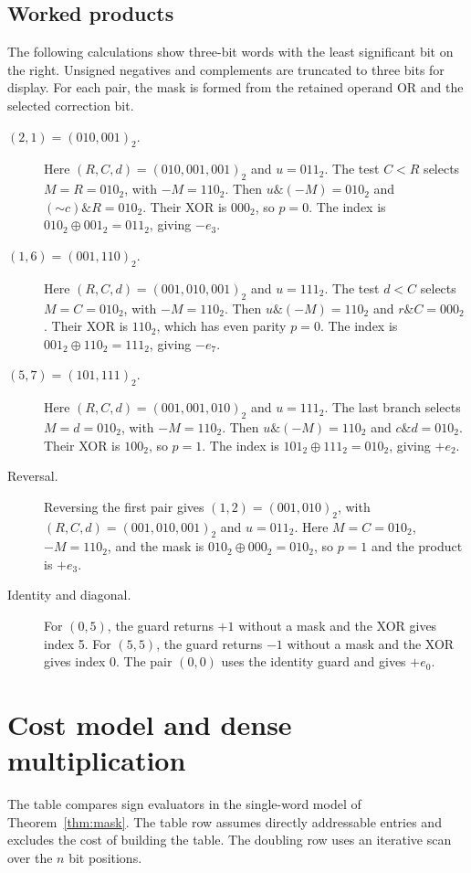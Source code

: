\documentclass[11pt]{article}
\newcommand{\band}{\mathbin{\&}}
\begin{document}
\subsection{Worked products}
The following calculations show three-bit words with the least significant
bit on the right. Unsigned negatives and complements are truncated to three
bits for display. For each pair, the mask is formed from the retained
operand OR and the selected correction bit.

\begin{description}
\item[\((2,1)=(010,001)_2\).]
Here \((R,C,d)=(010,001,001)_2\) and \(u=011_2\).
The test \(C<R\) selects \(M=R=010_2\), with \(-M=110_2\).
Then \(u\band(-M)=010_2\) and \((\mathord{\sim}c)\band R=010_2\).
Their XOR is \(000_2\), so \(p=0\). The index is
\(010_2\oplus001_2=011_2\), giving \(-e_3\).
\item[\((1,6)=(001,110)_2\).]
Here \((R,C,d)=(001,010,001)_2\) and \(u=111_2\).
The test \(d<C\) selects \(M=C=010_2\), with \(-M=110_2\).
Then \(u\band(-M)=110_2\) and \(r\band C=000_2\).
Their XOR is \(110_2\), which has even parity \(p=0\).
The index is \(001_2\oplus110_2=111_2\), giving \(-e_7\).
\item[\((5,7)=(101,111)_2\).]
Here \((R,C,d)=(001,001,010)_2\) and \(u=111_2\).
The last branch selects \(M=d=010_2\), with \(-M=110_2\).
Then \(u\band(-M)=110_2\) and \(c\band d=010_2\).
Their XOR is \(100_2\), so \(p=1\).
The index is \(101_2\oplus111_2=010_2\), giving \(+e_2\).
\item[Reversal.]
Reversing the first pair gives \((1,2)=(001,010)_2\),
with \((R,C,d)=(001,010,001)_2\) and \(u=011_2\).
Here \(M=C=010_2\), \(-M=110_2\), and the mask is
\(010_2\oplus000_2=010_2\), so \(p=1\) and the product is
\(+e_3\).
\item[Identity and diagonal.]
For \((0,5)\), the guard returns \(+1\) without a
mask and the XOR gives index 5. For \((5,5)\), the guard returns
\(-1\) without a mask and the XOR gives index 0. The pair \((0,0)\)
uses the identity guard and gives \(+e_0\).
\end{description}

\section{Cost model and dense multiplication}
The table compares sign evaluators in the single-word model of
Theorem~\ref{thm:mask}. The table row assumes directly addressable
entries and excludes the cost of building the table. The doubling row
uses an iterative scan over the \(n\) bit positions.
\end{document}
